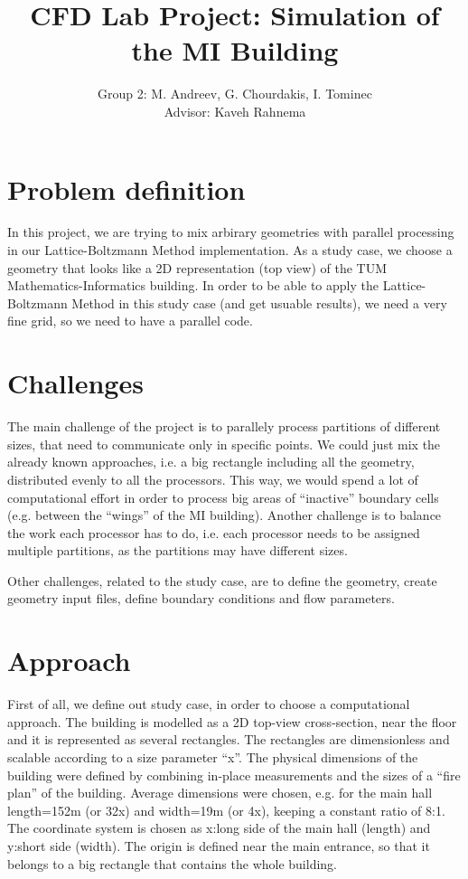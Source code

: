 \documentclass[a4paper,11pt]{article}
\title{CFD Lab Project: Simulation of the MI Building}
\author{Group 2: M. Andreev, G. Chourdakis, I. Tominec \\ Advisor: Kaveh Rahnema}
\begin{document}
\maketitle

\section{Problem definition}
In this project, we are trying to mix arbirary geometries with parallel processing
in our Lattice-Boltzmann Method implementation.
As a study case, we choose a geometry that looks like a 2D representation (top view) of the
TUM Mathematics-Informatics building. In order to be able to apply the Lattice-Boltzmann Method
in this study case (and get usuable results), we need a very fine grid, so we need
to have a parallel code.

\section{Challenges}
The main challenge of the project is to parallely process partitions of different
sizes, that need to communicate only in specific points. We could just mix the
already known approaches, i.e. a big rectangle including all the geometry, distributed
evenly to all the processors. This way, we would spend a lot of computational effort
in order to process big areas of ``inactive'' boundary cells (e.g. between the
``wings'' of the MI building). Another challenge is to balance the work each processor
has to do, i.e. each processor needs to be assigned multiple partitions, as the partitions
may have different sizes.

Other challenges, related to the study case, are to define the geometry,
create geometry input files, define boundary conditions and flow parameters.

\section{Approach}
First of all, we define out study case, in order to choose a computational approach.
The building is modelled as a 2D top-view cross-section, near the floor and it
is represented as several rectangles. The rectangles are dimensionless and scalable
according to a size parameter ``x''. The physical dimensions of the building were
defined by combining in-place measurements and the sizes of a ``fire plan'' of
the building. Average dimensions were chosen, e.g. for the main hall length=152m (or 32x)
and width=19m (or 4x), keeping a constant ratio of 8:1. The coordinate system
is chosen as x:long side of the main hall (length) and y:short side (width).
The origin is defined near the main entrance, so that it belongs to a big rectangle
that contains the whole building.
\end{document}

